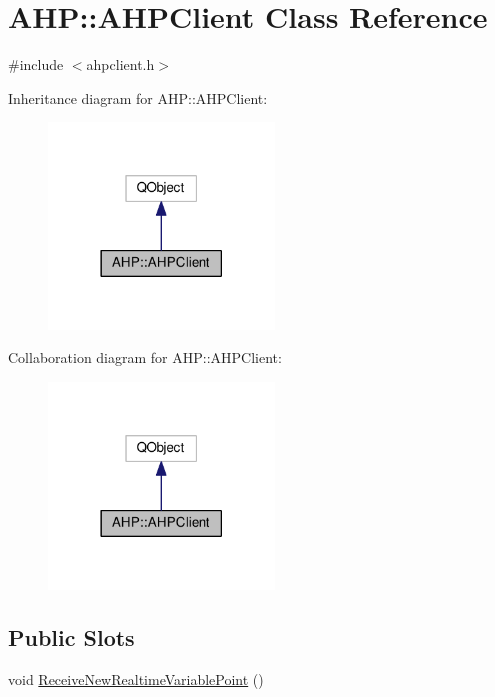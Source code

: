 \hypertarget{class_a_h_p_1_1_a_h_p_client}{}\section{A\+H\+P\+:\+:A\+H\+P\+Client Class Reference}
\label{class_a_h_p_1_1_a_h_p_client}


{\ttfamily \#include $<$ahpclient.\+h$>$}



Inheritance diagram for A\+H\+P\+:\+:A\+H\+P\+Client\+:
\nopagebreak
\begin{figure}[H]
\begin{center}
\leavevmode
\includegraphics[width=170pt]{class_a_h_p_1_1_a_h_p_client__inherit__graph}
\end{center}
\end{figure}


Collaboration diagram for A\+H\+P\+:\+:A\+H\+P\+Client\+:
\nopagebreak
\begin{figure}[H]
\begin{center}
\leavevmode
\includegraphics[width=170pt]{class_a_h_p_1_1_a_h_p_client__coll__graph}
\end{center}
\end{figure}
\subsection*{Public Slots}
\begin{DoxyCompactItemize}
\item 
void \hyperlink{class_a_h_p_1_1_a_h_p_client_ad3ebdd22c83a03ffb4663b2cff88279e}{Receive\+New\+Realtime\+Variable\+Point} ()
\end{DoxyCompactItemize}
